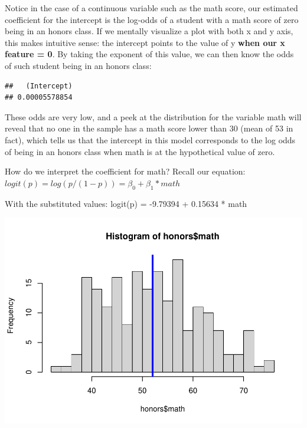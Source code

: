 \documentclass[
]{article}
\newenvironment{Shaded}{\begin{snugshade}}{\end{snugshade}}
\newcommand{\AttributeTok}[1]{\textcolor[rgb]{0.77,0.63,0.00}{#1}}
\newcommand{\DecValTok}[1]{\textcolor[rgb]{0.00,0.00,0.81}{#1}}
\newcommand{\FunctionTok}[1]{\textcolor[rgb]{0.00,0.00,0.00}{#1}}
\newcommand{\NormalTok}[1]{#1}
\newcommand{\SpecialCharTok}[1]{\textcolor[rgb]{0.00,0.00,0.00}{#1}}
\newcommand{\StringTok}[1]{\textcolor[rgb]{0.31,0.60,0.02}{#1}}
\begin{document}
Notice in the case of a continuous variable such as the math score, our
estimated coefficient for the intercept is the log-odds of a student
with a math score of zero being in an honors class. If we mentally
visualize a plot with both x and y axis, this makes intuitive sense: the
intercept points to the value of y \textbf{when our x feature = 0}. By
taking the exponent of this value, we can then know the odds of such
student being in an honors class:

\begin{Shaded}
\end{Shaded}

\begin{verbatim}
##   (Intercept) 
## 0.00005578854
\end{verbatim}

These odds are very low, and a peek at the distribution for the variable
math will reveal that no one in the sample has a math score lower than
30 (mean of 53 in fact), which tells us that the intercept in this model
corresponds to the log odds of being in an honors class when math is at
the hypothetical value of zero.

How do we interpret the coefficient for math? Recall our equation:
\(logit(p) = log(p/(1-p)) = \beta_0 + \beta_1 * math\)

With the substituted values: logit(p) = -9.79394 + 0.15634 * math

\begin{Shaded}
\end{Shaded}

\includegraphics{classification1_files/figure-latex/unnamed-chunk-28-1.pdf}
\end{document}

